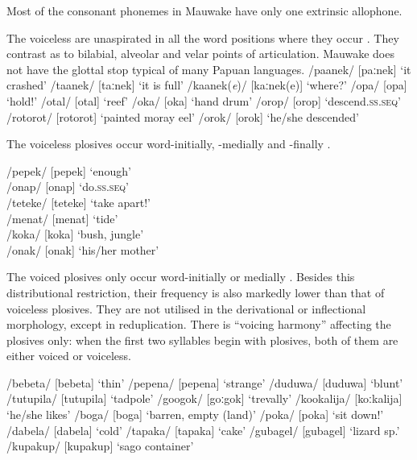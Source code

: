 Most of the consonant phonemes in Mauwake have only one extrinsic allophone. 

The voiceless  are unaspirated in all the word positions where they occur . They contrast as to bilabial, alveolar and velar points of articulation. Mauwake does not have the glottal stop typical of many Papuan languages. 
\renewcommand{\exfont}{\upshape}
\renewcommand{\eachwordone}{\upshape}
\ea\label{ex:2:voicelessplosives}
\ea
/{paanek}/  [{{\textprimstress}paːnek}]  `it crashed'
\ex
/{taanek}/  [{{\textprimstress}taːnek}]  `it is full'
\ex
/{kaanek}(\textit{e})/  [{{\textprimstress}kaːnek(e)}]  `where?'
\ex
/{opa}/  [o{{\textprimstress}pa}]  `hold!'
\ex
/{otal}/  [o{{\textprimstress}tal}]  `reef'
\ex
/{oka}/  [o{{\textprimstress}ka}]  `hand drum'
\ex
/{orop}/  [o{{\textprimstress}rop}]  `descend.\textsc{ss.seq}'
\ex
/{rotorot}/  [ro{{\textprimstress}torot}]  `painted moray eel'
\ex
/{orok}/  [o{{\textprimstress}rok}]  `he/she descended'
\z
\z


The voiceless plosives occur word-initially, -medially and -finally .

\ea\label{ex:2:positionofvoicelessplosives}
\ea
/{pepek}/    [pe{{\textprimstress}pek}]    `enough'\\
\ex
/{onap}/    [o{{\textprimstress}nap}]    `do.\textsc{ss.seq}'\\
\ex
/{teteke}/   [te{{\textprimstress}teke}]    `take apart!'\\
\ex
/{menat}/    [me{{\textprimstress}nat}]    `tide'\\
\ex
/{koka}/    [ko{{\textprimstress}ka}]   `bush, jungle'\\
\ex
/{onak}/    [o{{\textprimstress}nak}]   `his/her mother' \\
\z
\z

The voiced plosives only occur word-initially or medially . Besides this distributional restriction, their frequency is also markedly lower than that of voiceless plosives. They are not utilised in the derivational or inflectional morphology, except in reduplication. There is ``voicing harmony'' affecting the plosives only: when the first two syllables begin with plosives, both of them are either voiced or voiceless. 


\ea
\label{tab:2:voicedplosives}
\ea
/bebeta/  [be{{\textprimstress}beta}]  `thin'
\ex
/pepena/  [pe{{\textprimstress}pena}]  `strange'
\ex
/duduwa/  [du{{\textprimstress}duwa}]  `blunt'
\ex
/tutupila/  [tu{{\textprimstress}tupila}]  `tadpole'
\ex
/googok/  [{{\textprimstress}goːgok}]  `trevally'
\ex
/kookalija/  [{{\textprimstress}koːkalija}]  `he/she likes'
\ex
/boga/  [bo{{\textprimstress}ga}]  `barren, empty (land)'
\ex
/poka/  [po{{\textprimstress}ka}]  `sit down!'
\ex
/dabela/  [da{{\textprimstress}bela}]  `cold'
\ex
/tapaka/  [ta{{\textprimstress}paka}]  `cake'
\ex
/gubagel/  [gu{{\textprimstress}bagel}]  `lizard sp.' 
\ex
/kupakup/  [ku{{\textprimstress}pakup}]  `sago container'
\z
\z

